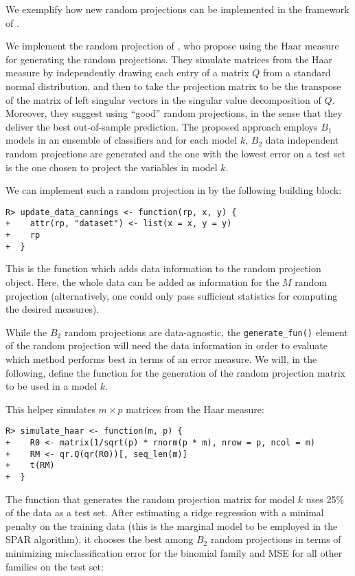 \documentclass[
  article,
  nojss]{jss}
\begin{document}
We exemplify how new random projections can be implemented in the
framework of .

We implement the random projection of \citet{cannings2017random}, who
propose using the Haar measure for generating the random projections.
They simulate matrices from the Haar measure by independently drawing
each entry of a matrix \(Q\) from a standard normal distribution, and
then to take the projection matrix to be the transpose of the matrix of
left singular vectors in the singular value decomposition of \(Q\).
Moreover, they suggest using ``good'' random projections, in the sense
that they deliver the best out-of-sample prediction. The proposed
approach employs \(B_1\) models in an ensemble of classifiers and for
each model \(k\), \(B_2\) data independent random projections are
generated and the one with the lowest error on a test set is the one
chosen to project the variables in model \(k\).

We can implement such a random projection in  by the following
building block:

\begin{verbatim}
R> update_data_cannings <- function(rp, x, y) {
+    attr(rp, "dataset") <- list(x = x, y = y)
+    rp
+  }
\end{verbatim}

This is the function which adds data information to the random
projection object. Here, the whole data can be added as information for
the \(M\) random projection (alternatively, one could only pass
sufficient statistics for computing the desired measures).

While the \(B_2\) random projections are data-agnostic, the
\texttt{generate\_fun()} element of the random projection will need the
data information in order to evaluate which method performs best in
terms of an error measure. We will, in the following, define the
function for the generation of the random projection matrix to be used
in a model \(k\).

This helper simulates \(m\times p\) matrices from the Haar measure:

\begin{verbatim}
R> simulate_haar <- function(m, p) {
+    R0 <- matrix(1/sqrt(p) * rnorm(p * m), nrow = p, ncol = m)
+    RM <- qr.Q(qr(R0))[, seq_len(m)]
+    t(RM)
+  }
\end{verbatim}

The function that generates the random projection matrix for model \(k\)
uses 25\% of the data as a test set. After estimating a ridge regression
with a minimal penalty on the training data (this is the marginal model
to be employed in the SPAR algorithm), it chooses the best among \(B_2\)
random projections in terms of minimizing misclassification error for
the binomial family and MSE for all other families on the test set:
\end{document}
